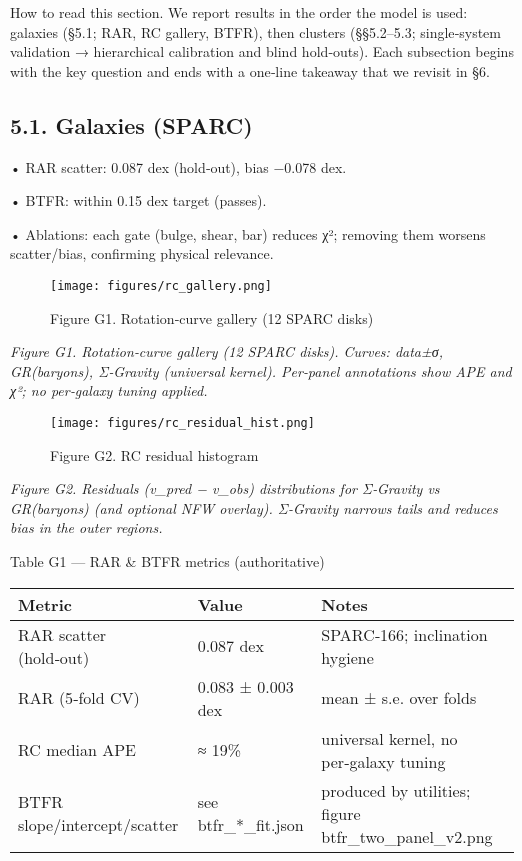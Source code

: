 \documentclass[11pt,a4paper]{article}
\begin{document}
How to read this section. We report results in the order the model is used: galaxies (§5.1; RAR, RC gallery, BTFR), then clusters (§§5.2–5.3; single‑system validation → hierarchical calibration and blind hold‑outs). Each subsection begins with the key question and ends with a one‑line takeaway that we revisit in §6.


\subsection{5.1. Galaxies (SPARC)}


• RAR scatter: 0.087 dex (hold‑out), bias −0.078 dex.  

• BTFR: within 0.15 dex target (passes).  

• Ablations: each gate (bulge, shear, bar) reduces χ²; removing them worsens scatter/bias, confirming physical relevance.


\begin{figure}[h]
\centering
\texttt{[image: figures/rc\_gallery.png]}
\caption{Figure G1. Rotation‑curve gallery (12 SPARC disks)}
\end{figure}


\textit{Figure G1. Rotation‑curve gallery (12 SPARC disks). Curves: data±σ, GR(baryons), Σ‑Gravity (universal kernel). Per‑panel annotations show APE and χ²; no per‑galaxy tuning applied.}


\begin{figure}[h]
\centering
\texttt{[image: figures/rc\_residual\_hist.png]}
\caption{Figure G2. RC residual histogram}
\end{figure}


\textit{Figure G2. Residuals (v\_pred − v\_obs) distributions for Σ‑Gravity vs GR(baryons) (and optional NFW overlay). Σ‑Gravity narrows tails and reduces bias in the outer regions.}


Table G1 — RAR \& BTFR metrics (authoritative)


\begin{table}[h]
\centering
\begin{tabular}{lll}
\toprule
Metric & Value & Notes \\
\midrule
RAR scatter (hold‑out) & 0.087 dex & SPARC‑166; inclination hygiene \\
RAR (5‑fold CV) & 0.083 ± 0.003 dex & mean ± s.e. over folds \\
RC median APE & ≈ 19\% & universal kernel, no per‑galaxy tuning \\
BTFR slope/intercept/scatter & see btfr\_*\_fit.json & produced by utilities; figure btfr\_two\_panel\_v2.png \\
\bottomrule
\end{tabular}
\end{table}
\end{document}
